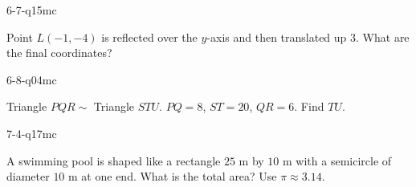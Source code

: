 \begin{practiceQuestion}{6-7-q15}{mc}
\begin{questionText}
Point $L(-1, -4)$ is reflected over the $y$-axis and then translated up $3$. What are the final coordinates?
\end{questionText}
\end{practiceQuestion}

\begin{practiceQuestion}{6-8-q04}{mc}
\begin{questionText}
Triangle $PQR \sim$ Triangle $STU$. $PQ = 8$, $ST = 20$, $QR = 6$. Find $TU$.
\end{questionText}
\end{practiceQuestion}

\begin{practiceQuestion}{7-4-q17}{mc}
\begin{questionText}
A swimming pool is shaped like a rectangle $25$ m by $10$ m with a semicircle of diameter $10$ m at one end. What is the total area? Use $\pi \approx 3.14$.
\end{questionText}
\end{practiceQuestion}

